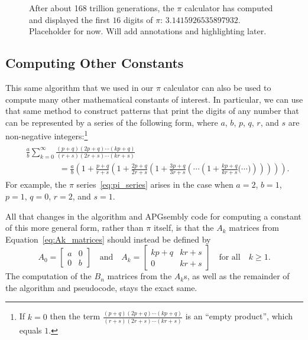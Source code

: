 \begin{figure}[!htbp]
	\centering{}
	
	\caption{After about 168 trillion generations, the $\pi$ calculator has computed and displayed the first $16$ digits of $\pi$: $3.1415926535897932$. Placeholder for now. Will add annotations and highlighting later.}\label{fig:pi_calc}
\end{figure}


\subsection{Computing Other Constants}\label{sec:pi_calc_other}

This same algorithm that we used in our $\pi$ calculator can also be used to compute many other mathematical constants of interest. In particular, we can use that same method to construct patterns that print the digits of any number that can be represented by a series of the following form, where $a$, $b$, $p$, $q$, $r$, and $s$ are non-negative integers:\footnote{If $k = 0$ then the term $\frac{(p+q)(2p+q)\cdots(kp+q)}{(r+s)(2r+s)\cdots(kr+s)}$ is an ``empty product'', which equals $1$.}
\begin{align}\begin{split}\label{eq:generalized_pi_series}
& \frac{a}{b}\sum_{k=0}^\infty \frac{(p+q)(2p+q)\cdots(kp+q)}{(r+s)(2r+s)\cdots(kr+s)} \\
& \qquad\qquad = \frac{a}{b}\left(1 + \frac{p+q}{r+s}\left( 1 + \frac{2p+q}{2r+s}\left( 1 + \frac{3p+q}{3r+s}\left( \cdots \left( 1 + \frac{kp+q}{kr+s}\Big( \cdots \Big) \right)\right)\right)\right)\right).
\end{split}\end{align}
For example, the $\pi$ series~\eqref{eq:pi_series} arises in the case when $a = 2$, $b = 1$, $p = 1$, $q = 0$, $r = 2$, and $s = 1$.

All that changes in the algorithm and APGsembly code for computing a constant of this more general form, rather than $\pi$ itself, is that the $A_k$ matrices from Equation~\eqref{eq:Ak_matrices} should instead be defined by
\[
A_0 = \begin{bmatrix}
a & 0 \\ 0 & b
\end{bmatrix} \quad \text{and} \quad A_k = \begin{bmatrix}
kp+q & kr+s \\ 0 & kr+s
\end{bmatrix} \quad \text{for all} \quad k \geq 1.
\]
The computation of the $B_n$ matrices from the $A_k$s, as well as the remainder of the algorithm and pseudocode, stays the exact same.

